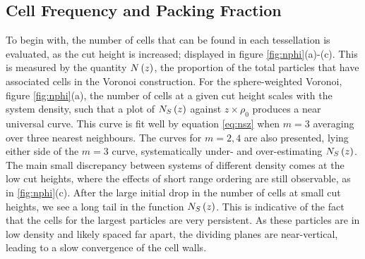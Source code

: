 \subsection{Cell Frequency and Packing Fraction}

To begin with, the number of cells that can be found in each tessellation is evaluated, as the cut height is increased; displayed in figure \ref{fig:nphi}(a)\--(c).
This is measured by the quantity $N\left(z\right)$, the proportion of the total particles that have associated cells in the Voronoi construction.
For the sphere\--weighted Voronoi, figure \ref{fig:nphi}(a), the number of cells at a given cut height scales with the system density, such that a plot of $N_S\left(z\right)$ against $z\times \rho_0$ produces a near universal curve.
This curve is fit well by equation \eqref{eq:nsz} when $m=3$ \ie{} averaging over three nearest neighbours.
The curves for $m=2,4$ are also presented, lying either side of the $m=3$ curve, systematically under\-- and over\--estimating $N_S\left(z\right)$.
The main small discrepancy between systems of different density comes at the low cut heights, where the effects of short range ordering are still observable, as in \ref{fig:nphi}(c).
After the large initial drop in the number of cells at small cut heights, we see a long tail in the function $N_S\left(z\right)$.
This is indicative of the fact that the cells for the largest particles are very persistent.
As these particles are in low density and likely spaced far apart, the dividing planes are near\--vertical, leading to a slow convergence of the cell walls.

